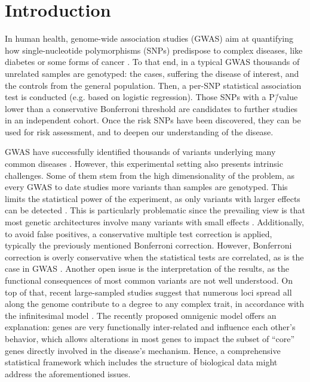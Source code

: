 \documentclass[twocolumn, 11pt]{article}
\begin{document}
\section{Introduction}

In human health, genome-wide association studies (GWAS) aim at quantifying how single-nucleotide polymorphisms (SNPs) predispose to complex diseases, like diabetes or some forms of cancer \cite{bush_chapter_2012}. To that end, in a typical GWAS thousands of unrelated samples are genotyped: the cases, suffering the disease of interest, and the controls from the general population. Then, a per-SNP statistical association test is conducted (e.g. based on logistic regression). Those SNPs with a P\=/value lower than a conservative Bonferroni threshold are candidates to further studies in an independent cohort. Once the risk SNPs have been discovered, they can be used for risk assessment, and to deepen our understanding of the disease.

GWAS have successfully identified thousands of variants underlying many common diseases \cite{buniello_nhgri-ebi_2019}. However, this experimental setting also presents intrinsic challenges. Some of them stem from the high dimensionality of the problem, as every GWAS to date studies more variants than samples are genotyped. This limits the statistical power of the experiment, as only variants with larger effects can be detected \cite{visscher_10_2017}. This is particularly problematic since the prevailing view is that most genetic architectures involve many variants with small effects \cite{visscher_10_2017}. Additionally, to avoid false positives, a conservative multiple test correction is applied, typically the previously mentioned Bonferroni correction. However, Bonferroni correction is overly conservative when the statistical tests are correlated, as is the case in GWAS \cite{wang_statistical_2018}. Another open issue is the interpretation of the results, as the functional consequences of most common variants are not well understood. On top of that, recent large-sampled studies suggest that numerous loci spread all along the genome contribute to a degree to any complex trait, in accordance with the infinitesimal model \cite{barton_infinitesimal_2017}. The recently proposed omnigenic model \cite{boyle_expanded_2017} offers an explanation: genes are very functionally inter-related and influence each other's behavior, which allows alterations in most genes to impact the subset of ``core'' genes directly involved in the disease's mechanism. Hence, a comprehensive statistical framework which includes the structure of biological data might address the aforementioned issues.
\end{document}
